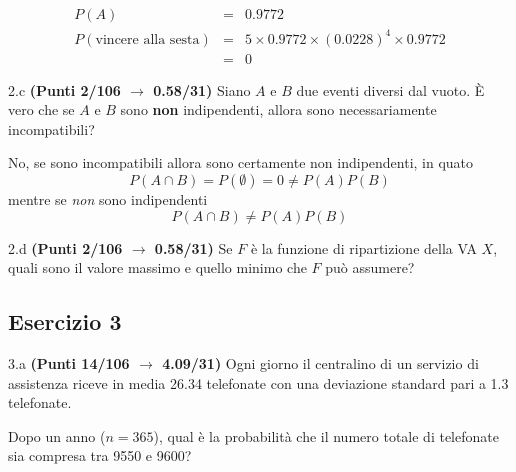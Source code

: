 \documentclass[
  11pt,
]{book}
\theoremstyle{mytheoremstyle}
\theoremstyle{mydefstyle}
\newenvironment{sol}
  {
  \begin{tcolorbox}[enhanced,breakable,arc=0.1mm,boxrule=1pt,colback=white,colframe=iblue,
  title=\bf \fontfamily{lmss}\selectfont \hspace{.5 cm} Soluzione,drop fuzzy shadow]

}{
\end{tcolorbox}
  }
\begin{document}
\begin{sol}
\begin{eqnarray*}
P(A)&=&0.9772\\
P(\text{vincere alla sesta})&=&5\times0.9772\times (0.0228)^4\times 0.9772\\
&=& 0
\end{eqnarray*}

\end{sol}

2.c \textbf{(Punti 2/106 \(\rightarrow\) 0.58/31)} Siano \(A\) e \(B\) due eventi diversi dal vuoto. È vero che se \(A\) e \(B\) sono
\textbf{non} indipendenti, allora sono necessariamente incompatibili?

\begin{sol}
No, se sono incompatibili allora sono certamente non indipendenti, in quato
\[
P(A\cap B)=P(\emptyset)=0\ne P(A)P(B)
\]
mentre se \emph{non} sono indipendenti
\[
P(A\cap B)\ne P(A)P(B)
\]

\end{sol}

2.d \textbf{(Punti 2/106 \(\rightarrow\) 0.58/31)} Se \(F\) è la funzione di ripartizione della VA \(X\),
quali sono il valore massimo e quello minimo che \(F\) può assumere?

\subsection{Esercizio 3}\label{esercizio-3-13}

3.a \textbf{(Punti 14/106 \(\rightarrow\) 4.09/31)} Ogni giorno il centralino di un servizio di assistenza riceve in media 26.34 telefonate con una deviazione standard pari a 1.3 telefonate.

Dopo un anno (\(n=365\)), qual è la probabilità che il numero totale di telefonate sia compresa tra 9550 e 9600?
\end{document}
